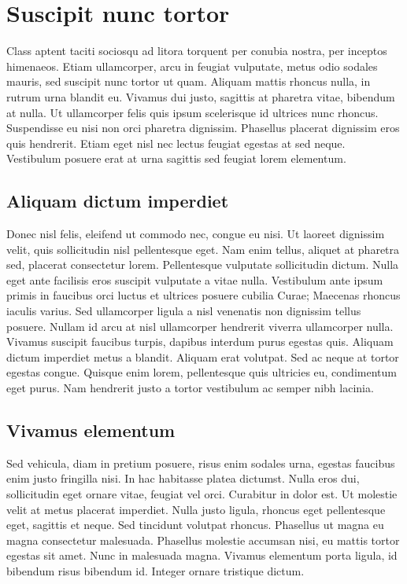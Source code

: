 \section{Suscipit nunc tortor}

 Class aptent taciti sociosqu ad litora torquent per conubia nostra, per inceptos himenaeos. Etiam ullamcorper, arcu in feugiat vulputate, metus odio sodales mauris, sed suscipit nunc tortor ut quam. Aliquam mattis rhoncus nulla, in rutrum urna blandit eu. Vivamus dui justo, sagittis at pharetra vitae, bibendum at nulla. Ut ullamcorper felis quis ipsum scelerisque id ultrices nunc rhoncus. Suspendisse eu nisi non orci pharetra dignissim. Phasellus placerat dignissim eros quis hendrerit. Etiam eget nisl nec lectus feugiat egestas at sed neque. Vestibulum posuere erat at urna sagittis sed feugiat lorem elementum.


\subsection{Aliquam dictum imperdiet}

Donec nisl felis, eleifend ut commodo nec, congue eu nisi. Ut laoreet dignissim velit, quis sollicitudin nisl pellentesque eget. Nam enim tellus, aliquet at pharetra sed, placerat consectetur lorem. Pellentesque vulputate sollicitudin dictum. Nulla eget ante facilisis eros suscipit vulputate a vitae nulla. Vestibulum ante ipsum primis in faucibus orci luctus et ultrices posuere cubilia Curae; Maecenas rhoncus iaculis varius. Sed ullamcorper ligula a nisl venenatis non dignissim tellus posuere. Nullam id arcu at nisl ullamcorper hendrerit viverra ullamcorper nulla. Vivamus suscipit faucibus turpis, dapibus interdum purus egestas quis. Aliquam dictum imperdiet metus a blandit. Aliquam erat volutpat. Sed ac neque at tortor egestas congue. Quisque enim lorem, pellentesque quis ultricies eu, condimentum eget purus. Nam hendrerit justo a tortor vestibulum ac semper nibh lacinia. 

\subsection{Vivamus elementum}

Sed vehicula, diam in pretium posuere, risus enim sodales urna, egestas faucibus enim justo fringilla nisi. In hac habitasse platea dictumst. Nulla eros dui, sollicitudin eget ornare vitae, feugiat vel orci. Curabitur in dolor est. Ut molestie velit at metus placerat imperdiet. Nulla justo ligula, rhoncus eget pellentesque eget, sagittis et neque. Sed tincidunt volutpat rhoncus. Phasellus ut magna eu magna consectetur malesuada. Phasellus molestie accumsan nisi, eu mattis tortor egestas sit amet. Nunc in malesuada magna. Vivamus elementum porta ligula, id bibendum risus bibendum id. Integer ornare tristique dictum. 


